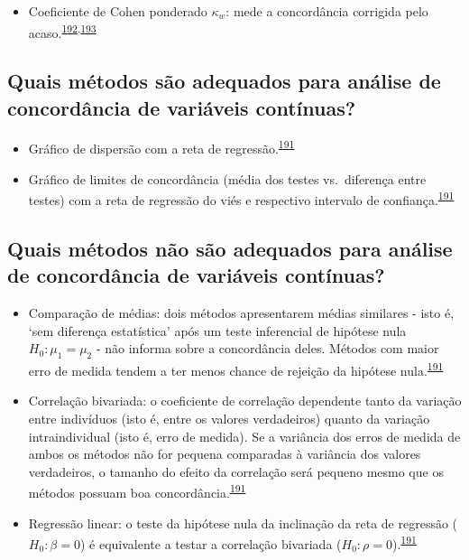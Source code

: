\documentclass[
  a4paper,
]{book}
\providecommand{\tightlist}{%
  \setlength{\itemsep}{0pt}\setlength{\parskip}{0pt}}
\begin{document}
\begin{itemize}
\tightlist
\item
  Coeficiente de Cohen ponderado \(\kappa_{w}\): mede a concordância corrigida pelo acaso.\textsuperscript{\protect\hyperlink{ref-scott1955}{192},\protect\hyperlink{ref-cohen1960}{193}}
\end{itemize}

\hypertarget{quais-muxe9todos-suxe3o-adequados-para-anuxe1lise-de-concorduxe2ncia-de-variuxe1veis-contuxednuas}{%
\subsection{Quais métodos são adequados para análise de concordância de variáveis contínuas?}\label{quais-muxe9todos-suxe3o-adequados-para-anuxe1lise-de-concorduxe2ncia-de-variuxe1veis-contuxednuas}}

\begin{itemize}
\item
  Gráfico de dispersão com a reta de regressão.\textsuperscript{\protect\hyperlink{ref-altman1983}{191}}
\item
  Gráfico de limites de concordância (média dos testes vs.~diferença entre testes) com a reta de regressão do viés e respectivo intervalo de confiança.\textsuperscript{\protect\hyperlink{ref-altman1983}{191}}
\end{itemize}

\hypertarget{quais-muxe9todos-nuxe3o-suxe3o-adequados-para-anuxe1lise-de-concorduxe2ncia-de-variuxe1veis-contuxednuas}{%
\subsection{Quais métodos não são adequados para análise de concordância de variáveis contínuas?}\label{quais-muxe9todos-nuxe3o-suxe3o-adequados-para-anuxe1lise-de-concorduxe2ncia-de-variuxe1veis-contuxednuas}}

\begin{itemize}
\item
  Comparação de médias: dois métodos apresentarem médias similares - isto é, `sem diferença estatística' após um teste inferencial de hipótese nula \(H_{0}:\mu_{1} = \mu_{2}\) - não informa sobre a concordância deles. Métodos com maior erro de medida tendem a ter menos chance de rejeição da hipótese nula.\textsuperscript{\protect\hyperlink{ref-altman1983}{191}}
\item
  Correlação bivariada: o coeficiente de correlação dependente tanto da variação entre indivíduos (isto é, entre os valores verdadeiros) quanto da variação intraindividual (isto é, erro de medida). Se a variância dos erros de medida de ambos os métodos não for pequena comparadas à variância dos valores verdadeiros, o tamanho do efeito da correlação será pequeno mesmo que os métodos possuam boa concordância.\textsuperscript{\protect\hyperlink{ref-altman1983}{191}}
\item
  Regressão linear: o teste da hipótese nula da inclinação da reta de regressão (\(H_{0}:\beta = 0\)) é equivalente a testar a correlação bivariada (\(H_{0}:\rho = 0\)).\textsuperscript{\protect\hyperlink{ref-altman1983}{191}}
\end{itemize}
\end{document}
